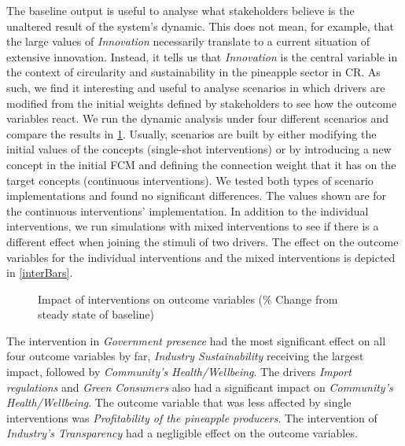 The baseline output is useful to analyse what stakeholders believe is the unaltered result of the system's dynamic. This does not mean, for example, that the large values of \textit{Innovation} necessarily translate to a current situation of extensive innovation. Instead, it tells us that \textit{Innovation} is the central variable in the context of circularity and sustainability in the pineapple sector in CR. As such, we find it interesting and useful to analyse scenarios in which drivers are modified from the initial weights defined by stakeholders to see how the outcome variables react. We run the dynamic analysis under four different scenarios and compare the results in \cref{interTable}. Usually, scenarios are built by either modifying the initial values of the concepts (single-shot interventions) or by introducing a new concept in the initial FCM and defining the connection weight that it has on the target concepts (continuous interventions). We tested both types of scenario implementations and found no significant differences. The values shown are for the continuous interventions' implementation. In addition to the individual interventions, we run simulations with mixed interventions to see if there is a different effect when joining the stimuli of two drivers. The effect on the outcome variables for the individual interventions and the mixed interventions is depicted in \cref{interBars}.


\begin{figure}[ht]
\caption[Impact of interventions on outcome variables]{Impact of interventions on outcome variables (\% Change from steady state of baseline)} 
\label{interTable}
\centering

\end{figure}


The intervention in \textit{Government presence} had the most significant effect on all four outcome variables by far, \textit{Industry Sustainability} receiving the largest impact, followed by \textit{Community's Health/Wellbeing}. The drivers \textit{Import regulations} and \textit{Green Consumers} also had a significant impact on \textit{Community's Health/Wellbeing}. The outcome variable that was less affected by single interventions was \textit{Profitability of the pineapple producers}. The intervention of \textit{Industry's Transparency} had a negligible effect on the outcome variables.  

